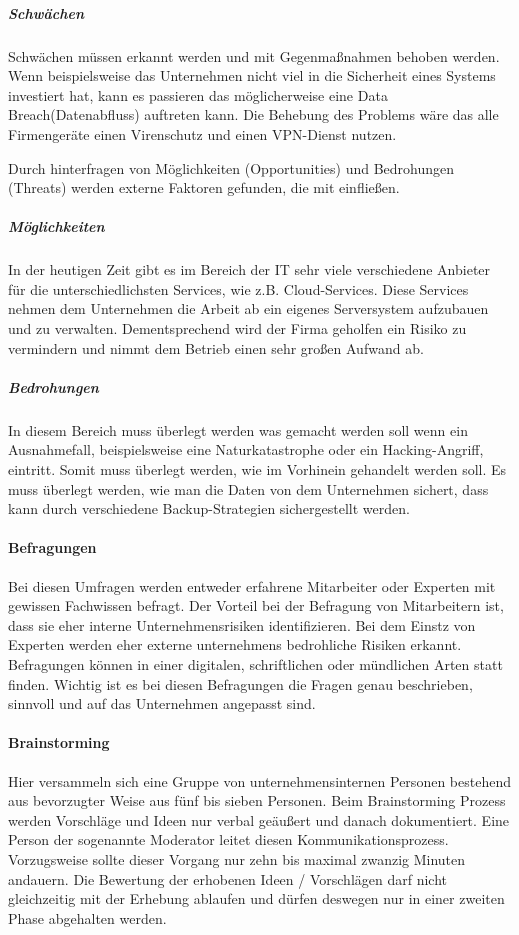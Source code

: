 \subparagraph{Schwächen}
Schwächen müssen erkannt werden und mit Gegenmaßnahmen behoben werden.
Wenn beispielsweise das Unternehmen nicht viel in die Sicherheit eines Systems investiert hat, kann es passieren das möglicherweise eine Data Breach(Datenabfluss) auftreten kann. Die Behebung des Problems wäre das alle Firmengeräte einen Virenschutz und einen VPN-Dienst nutzen.

Durch hinterfragen von Möglichkeiten (Opportunities) und Bedrohungen (Threats) werden externe Faktoren gefunden, die mit einfließen.

\subparagraph{Möglichkeiten}
In der heutigen Zeit gibt es im Bereich der IT sehr viele verschiedene Anbieter für die unterschiedlichsten Services, wie z.B. Cloud-Services.
Diese Services nehmen dem Unternehmen die Arbeit ab ein eigenes Serversystem aufzubauen und zu verwalten. Dementsprechend wird der Firma geholfen ein Risiko zu vermindern und nimmt dem Betrieb einen sehr großen Aufwand ab. 

\subparagraph{Bedrohungen}
In diesem Bereich muss überlegt werden was gemacht werden soll wenn ein Ausnahmefall, beispielsweise eine Naturkatastrophe oder ein Hacking-Angriff, eintritt. Somit muss überlegt werden, wie im Vorhinein gehandelt werden soll. Es muss überlegt werden, wie man die Daten von dem Unternehmen sichert, dass kann durch verschiedene Backup-Strategien sichergestellt werden.


\paragraph{Befragungen}
Bei diesen Umfragen werden entweder erfahrene Mitarbeiter oder Experten mit gewissen Fachwissen befragt. Der Vorteil bei der Befragung von Mitarbeitern ist, dass sie eher interne Unternehmensrisiken identifizieren. Bei dem Einstz von Experten werden eher externe unternehmens bedrohliche Risiken erkannt. Befragungen können in einer digitalen, schriftlichen oder mündlichen Arten statt finden.
Wichtig ist es bei diesen Befragungen die Fragen genau beschrieben, sinnvoll und auf das Unternehmen angepasst sind.

\paragraph{Brainstorming}
Hier versammeln sich eine Gruppe von unternehmensinternen Personen bestehend aus bevorzugter Weise aus fünf bis sieben Personen. 
Beim Brainstorming Prozess werden Vorschläge und Ideen nur verbal geäußert und danach dokumentiert. Eine Person der sogenannte Moderator leitet diesen Kommunikationsprozess. Vorzugsweise sollte dieser Vorgang nur zehn bis maximal zwanzig Minuten andauern.
Die Bewertung der erhobenen Ideen / Vorschlägen darf nicht gleichzeitig mit der Erhebung ablaufen und dürfen deswegen nur in einer zweiten Phase abgehalten werden.

